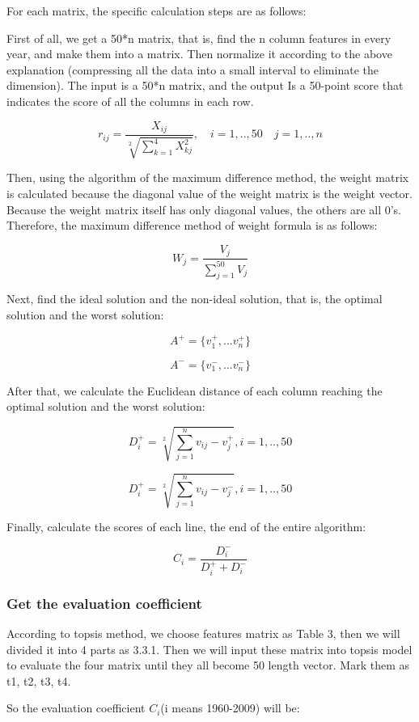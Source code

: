 \documentclass[a4paper]{article}
\begin{document}
For each matrix, the specific calculation steps are as follows:

First of all, we get a 50*n matrix, that is, find the n column features in every year, and make them into a matrix. Then normalize it according to the above explanation (compressing all the data into a small interval to eliminate the dimension). The input is a 50*n matrix, and the output Is a 50-point score that indicates the score of all the columns in each row.

\[r_{ij} = \frac{X_{ij}}{\sqrt[2]{\sum_{k=1}^{4}{X_{kj}^{2}}}},\quad i=1,..,50\quad j = 1,..,n\]

Then, using the algorithm of the maximum difference method, the weight matrix is calculated because the diagonal value of the weight matrix is the weight vector. Because the weight matrix itself has only diagonal values, the others are all 0's. Therefore, the maximum difference method of weight formula is as follows:

\[W_j = \frac{V_j}{\sum_{j=1}^{50}{V_j}}\]

Next, find the ideal solution and the non-ideal solution, that is, the optimal solution and the worst solution:

\[A^{+} = \{v_{1}^{+}, ...v_{n}^{+}\}\]

\[A^{-} = \{v_{1}^{-}, ...v_{n}^{-}\}\]

After that, we calculate the Euclidean distance of each column reaching the optimal solution and the worst solution:

\[D_{i}^{+} = \sqrt[2]{\sum_{j=1}^{n}{v_{ij}-v_{j}^{+}}}, i=1,..,50\]

\[D_{i}^{+} = \sqrt[2]{\sum_{j=1}^{n}{v_{ij}-v_{j}^{-}}}, i=1,..,50\]

Finally, calculate the scores of each line, the end of the entire algorithm:

\[C_i = \frac{D_{i}^{-}}{D_{i}^{+} + D_{i}^{-}}\]

\subsubsection{Get the evaluation coefficient}

According to topsis method\cite{topsis2}, we choose features matrix as Table 3, then we will divided it into 4 parts as 3.3.1. Then we will input these matrix into topsis model to evaluate the four matrix until they all become 50 length vector. Mark them as t1, t2, t3, t4.

So the evaluation coefficient $C_i$(i means 1960-2009) will be:
\end{document}
